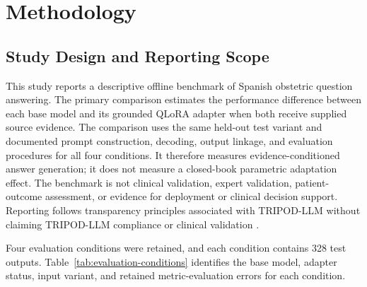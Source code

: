 \section{Methodology}
\label{sec:methodology}

\subsection{Study Design and Reporting Scope}

This study reports a descriptive offline benchmark of Spanish obstetric question answering. The primary comparison estimates the performance difference between each base model and its grounded QLoRA adapter when both receive supplied source evidence. The comparison uses the same held-out test variant and documented prompt construction, decoding, output linkage, and evaluation procedures for all four conditions. It therefore measures evidence-conditioned answer generation; it does not measure a closed-book parametric adaptation effect. The benchmark is not clinical validation, expert validation, patient-outcome assessment, or evidence for deployment or clinical decision support. Reporting follows transparency principles associated with TRIPOD-LLM without claiming TRIPOD-LLM compliance or clinical validation \cite{Gallifant2025TRIPODLLM}.

Four evaluation conditions were retained, and each condition contains 328 test outputs. Table~\ref{tab:evaluation-conditions} identifies the base model, adapter status, input variant, and retained metric-evaluation errors for each condition.

